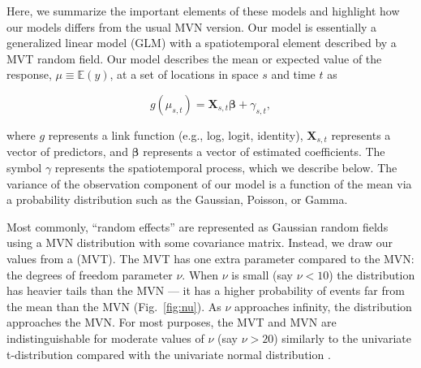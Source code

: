 \documentclass[12pt,english]{article}
\begin{document}
\begin{spacing}{1.25}
Here, we summarize the important elements of these models and
highlight how our models differs from the usual MVN version. Our model is
essentially a generalized linear model (GLM) with a spatiotemporal element
described by a MVT random field. Our model describes the mean or expected value
of the response, $\mu \equiv \mathbb{E}(y)$, at a set of locations in space $s$
and time $t$ as

\begin{equation}
  g(\mu_{s,t}) = \bm{X}_{s,t} \bm{\beta} + \gamma_{s,t},
\end{equation}

\noindent where $g$ represents a link function (e.g., log, logit, identity),
$\bm{X}_{s,t}$ represents a vector of predictors, and $\bm{\beta}$ represents a
vector of estimated coefficients.
The symbol $\gamma$ represents the spatiotemporal process,
which we describe below.
The variance of the observation component of
our model is a function of the mean via a
probability distribution such as the Gaussian, Poisson, or Gamma.

Most commonly, ``random effects'' are represented
as Gaussian random fields using
a MVN distribution with some covariance matrix.
Instead, we draw our values from a (MVT). The MVT
has one extra parameter compared to the MVN: the degrees of freedom parameter
$\nu$. When $\nu$ is small (say $\nu < 10$) the distribution has heavier
tails than the MVN --- it has a higher probability of events far from the mean than the MVN (Fig.~\ref{fig:nu}).
As $\nu$ approaches infinity, the distribution approaches
the MVN. For most purposes, the MVT and MVN are indistinguishable for moderate
values of $\nu$ (say $\nu > 20$) similarly to the univariate t-distribution
compared with the univariate normal distribution \citep[e.g.,][]{anderson2017}.


\end{spacing}
\end{document}
